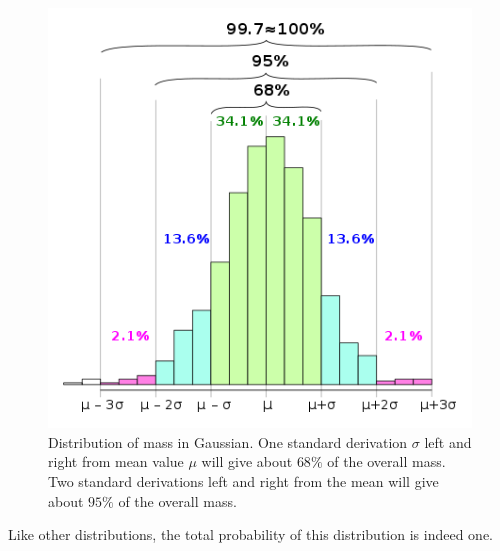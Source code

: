 \documentclass[12pt, a4paper]{article}
\begin{document}
\begin{figure}[H]
\centering
\includegraphics[width=120mm]{16.png}
\caption{Distribution of mass in Gaussian. One standard derivation $\sigma$ left and right from mean value $\mu$ will give about $68\%$ of the overall mass. Two standard derivations left and right from the mean will give about $95\%$ of the overall mass.}
\end{figure}

Like other distributions, the total probability of this distribution is indeed one.
\end{document}
